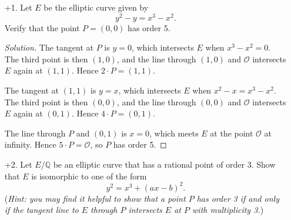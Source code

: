 \documentclass[a4paper]{article}
\theoremstyle{definition}
\renewcommand{\O}{\mathcal{O}}
\newcommand{\Q}{\mathbb{Q}}
\begin{document}
\begin{enumerate}
    \item[+1.] Let $E$ be the elliptic curve given by
        \begin{equation*}
            y^2-y = x^3-x^2.
        \end{equation*}
        Verify that the point $P=(0,0)$ has order 5.

        \begin{proof}[Solution]
            The tangent at $P$ is $y=0$, which intersects $E$ when $x^3-x^2=0$.
            The third point is then $(1,0)$, and the line through $(1,0)$ and
            $\O$ intersects $E$ again at $(1,1)$. Hence $2\cdot P=(1,1)$.

            The tangent at $(1,1)$ is $y=x$, which intersects $E$ when
            $x^2-x=x^3-x^2$. The third point is then $(0,0)$, and the line
            through $(0,0)$ and $\O$ intersects $E$ again at $(0,1)$. Hence
            $4\cdot P=(0,1)$.

            The line through $P$ and $(0,1)$ is $x=0$, which meets $E$ at the
            point $\O$ at infinity. Hence $5\cdot P=\O$, so $P$ has order 5.
        \end{proof}

    \item[+2.] Let $E/\Q$ be an elliptic curve that has a rational point of order
        3. Show that $E$ is isomorphic to one of the form
        \begin{equation*}
            y^2 = x^3 + (ax-b)^2.
        \end{equation*}
        (\textit{Hint: you may find it helpful to show that a point $P$ has
        order 3 if and only if the tangent line to $E$ through $P$ intersects
        $E$ at $P$ with multiplicity 3.})


\end{enumerate}
\end{document}
